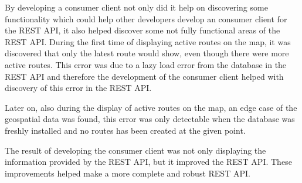 \bigskip
By developing a consumer client not only did it help on discovering some functionality which could help other developers develop an consumer client for the REST API, it also helped discover some not fully functional areas of the REST API.
During the first time of displaying active routes on the map, it was discovered that only the latest route would show, even though there were more active routes.
This error was due to a lazy load error from the database in the REST API and therefore the development of the consumer client helped with discovery of this error in the REST API.

Later on, also during the display of active routes on the map, an edge case of the geospatial data was found, this error was only detectable when the database was freshly installed and no routes has been created at the given point.

\bigskip
The result of developing the consumer client was not only displaying the information provided by the REST API, but it improved the REST API.
These improvements helped make a more complete and robust REST API.
